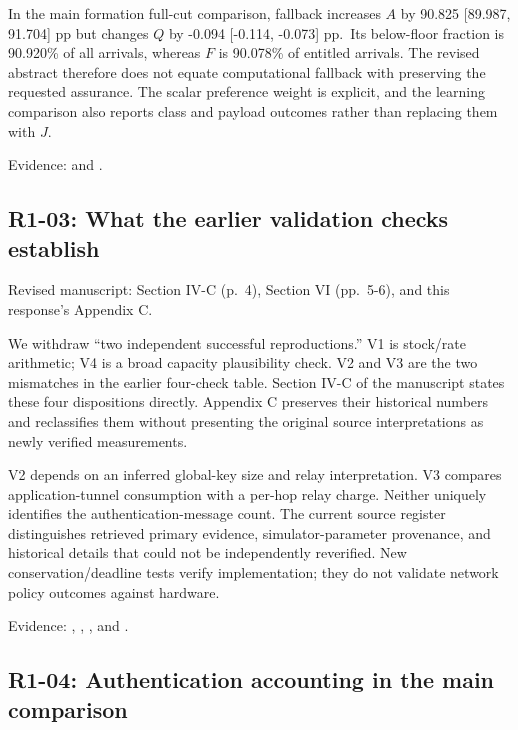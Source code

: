 \documentclass[a4paper,11pt]{article}
\begin{document}
In the main formation full-cut comparison, fallback increases \(A\) by 90.825 {[}89.987, 91.704{]} pp but changes \(Q\) by -0.094 {[}-0.114, -0.073{]} pp.~Its below-floor fraction is 90.920\% of all arrivals, whereas \(F\) is 90.078\% of entitled arrivals. The revised abstract therefore does not equate computational fallback with preserving the requested assurance. The scalar preference weight is explicit, and the learning comparison also reports class and payload outcomes rather than replacing them with \(J\).

Evidence:  and .

\subsection{R1-03: What the earlier validation checks establish}\label{r1-03-what-the-earlier-validation-checks-establish}

Revised manuscript: Section IV-C (p.~4), Section VI (pp.~5-6), and this response's Appendix C.

We withdraw ``two independent successful reproductions.'' V1 is stock/rate arithmetic; V4 is a broad capacity plausibility check. V2 and V3 are the two mismatches in the earlier four-check table. Section IV-C of the manuscript states these four dispositions directly. Appendix C preserves their historical numbers and reclassifies them without presenting the original source interpretations as newly verified measurements.

V2 depends on an inferred global-key size and relay interpretation. V3 compares application-tunnel consumption with a per-hop relay charge. Neither uniquely identifies the authentication-message count. The current source register distinguishes retrieved primary evidence, simulator-parameter provenance, and historical details that could not be independently reverified. New conservation/deadline tests verify implementation; they do not validate network policy outcomes against hardware.

Evidence: , , , and .

\subsection{R1-04: Authentication accounting in the main comparison}\label{r1-04-authentication-accounting-in-the-main-comparison}
\end{document}
